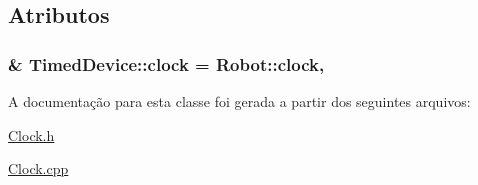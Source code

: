 \subsection{Atributos}
\hypertarget{classTimedDevice_ab7a7601ea3e4ecea7a388d9216c67aaf}{
\subsubsection[{clock}]{ \& Timed\-Device\-::clock = Robot\-::clock\hspace{0.3cm}{\ttfamily [static]}, {\ttfamily [protected]}}}\label{classTimedDevice_ab7a7601ea3e4ecea7a388d9216c67aaf}


A documentação para esta classe foi gerada a partir dos seguintes arquivos\-:\begin{DoxyCompactItemize}
\item 
\hyperlink{Clock_8h}{Clock.\-h}\item 
\hyperlink{Clock_8cpp}{Clock.\-cpp}\end{DoxyCompactItemize}
